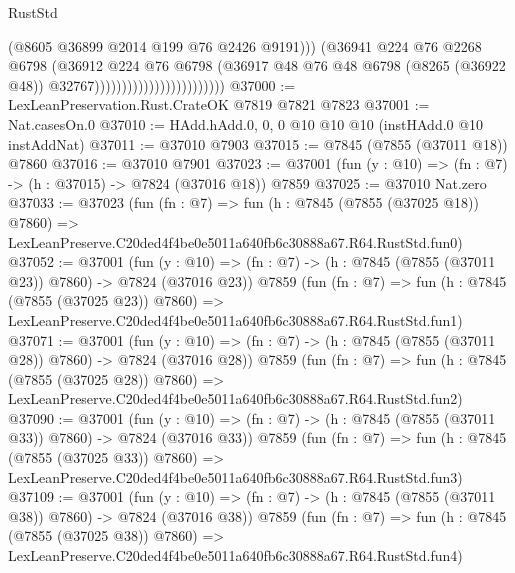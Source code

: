 \begin{lexlean}{RustStd}
\begin{coremodule}
                                                  (@8605 @36899 @2014 @199 @76 @2426 @9191)))
                                              (@36941
                                                @224
                                                @76
                                                @2268
                                                @6798
                                                (@36912
                                                  @224
                                                  @76
                                                  @6798
                                                  (@36917
                                                    @48
                                                    @76
                                                    @48
                                                    @6798
                                                    (@8265 (@36922 @48))
                                                    @32767))))))))))))))))))))))))
@37000 := LexLeanPreservation.Rust.CrateOK @7819 @7821 @7823
@37001 := Nat.casesOn.{0}
@37010 := HAdd.hAdd.{0, 0, 0} @10 @10 @10 (instHAdd.{0} @10 instAddNat)
@37011 := @37010 @7903
@37015 := @7845 (@7855 (@37011 @18)) @7860
@37016 := @37010 @7901
@37023 := @37001 (fun (y : @10) => (fn : @7) -> (h : @37015) -> @7824 (@37016 @18)) @7859
@37025 := @37010 Nat.zero
@37033 := @37023
    (fun (fn : @7) =>
    fun (h : @7845 (@7855 (@37025 @18)) @7860) =>
    LexLeanPreserve.C20ded4f4be0e5011a640fb6c30888a67.R64.RustStd.fun0)
@37052 := @37001
    (fun (y : @10) => (fn : @7) -> (h : @7845 (@7855 (@37011 @23)) @7860) -> @7824 (@37016 @23))
    @7859
    (fun (fn : @7) =>
    fun (h : @7845 (@7855 (@37025 @23)) @7860) =>
    LexLeanPreserve.C20ded4f4be0e5011a640fb6c30888a67.R64.RustStd.fun1)
@37071 := @37001
    (fun (y : @10) => (fn : @7) -> (h : @7845 (@7855 (@37011 @28)) @7860) -> @7824 (@37016 @28))
    @7859
    (fun (fn : @7) =>
    fun (h : @7845 (@7855 (@37025 @28)) @7860) =>
    LexLeanPreserve.C20ded4f4be0e5011a640fb6c30888a67.R64.RustStd.fun2)
@37090 := @37001
    (fun (y : @10) => (fn : @7) -> (h : @7845 (@7855 (@37011 @33)) @7860) -> @7824 (@37016 @33))
    @7859
    (fun (fn : @7) =>
    fun (h : @7845 (@7855 (@37025 @33)) @7860) =>
    LexLeanPreserve.C20ded4f4be0e5011a640fb6c30888a67.R64.RustStd.fun3)
@37109 := @37001
    (fun (y : @10) => (fn : @7) -> (h : @7845 (@7855 (@37011 @38)) @7860) -> @7824 (@37016 @38))
    @7859
    (fun (fn : @7) =>
    fun (h : @7845 (@7855 (@37025 @38)) @7860) =>
    LexLeanPreserve.C20ded4f4be0e5011a640fb6c30888a67.R64.RustStd.fun4)

\end{coremodule}
\end{lexlean}

